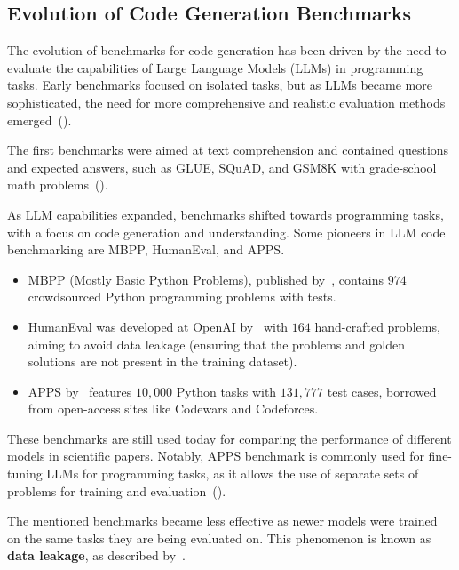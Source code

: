 \subsection{Evolution of Code Generation Benchmarks}

The evolution of benchmarks for code generation has been driven by the need to evaluate the capabilities of Large Language Models (LLMs) in programming tasks.
Early benchmarks focused on isolated tasks, but as LLMs became more sophisticated, the need for more comprehensive and realistic evaluation methods emerged~(\cite{paul2024benchmarksmetricsevaluationscode}).

The first benchmarks were aimed at text comprehension and contained questions and expected answers, such as GLUE, SQuAD, and GSM8K with grade-school math problems~(\cite{vendrow2025largelanguagemodelbenchmarks}).

As LLM capabilities expanded, benchmarks shifted towards programming tasks, with a focus on code generation and understanding.
Some pioneers in LLM code benchmarking are MBPP, HumanEval, and APPS.

\begin{itemize}
\item MBPP (Mostly Basic Python Problems), published by~\cite{austin2021program}, contains $974$ crowdsourced Python programming problems with tests.

\item HumanEval was developed at OpenAI by~\cite{chen2021evaluatinglargelanguagemodels} with $164$ hand-crafted problems, aiming to avoid data leakage (ensuring that the problems and golden solutions are not present in the training dataset).

\item APPS by~\cite{hendrycksapps2021} features $10,000$ Python tasks with $131,777$ test cases, borrowed from open-access sites like Codewars and Codeforces.
\end{itemize}
These benchmarks are still used today for comparing the performance of different models in scientific papers.
Notably, APPS benchmark is commonly used for fine-tuning LLMs for programming tasks, as it allows the use of separate sets of problems for training and evaluation~(\cite{bigcode-evaluation-harness}).

The mentioned benchmarks became less effective as newer models were trained on the same tasks they are being evaluated on.
This phenomenon is known as \textbf{data leakage}, as described by~\cite{vendrow2025largelanguagemodelbenchmarks}.

